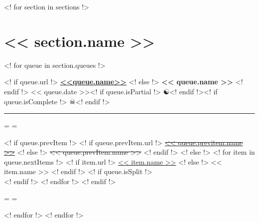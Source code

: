 \documentclass[a4paper]{article}
\newenvironment{fontspace}[2]
{\par
  \origiwspc=\fontdimen2\font
  \origiwstr=\fontdimen3\font
  \fontdimen2\font=#1\origiwspc
  \fontdimen3\font=#2\origiwstr
}
{\par
   \fontdimen2\font=\origiwspc
   \fontdimen3\font=\origiwstr
}
\newcommand*{\partialMark}{☯}
\newcommand*{\completeMark}{☠}
\newcommand*{\previous}[1]{\st{#1}}
\begin{document}
<! for section in sections !>
\section*{<< section.name >>}

<! for queue in section.queues !>
\begin{minipage}{1.0\textwidth}
<! if queue.url !>
\href{<< queue.url >>}{\bfseries <<queue.name>>}\hfill
<! else !>
\textbf{<< queue.name >>}\hfill
<! endif !>
<< queue.date >><! if queue.isPartial !> \partialMark<! endif !><! if queue.isComplete !> \completeMark<! endif !>\\
\vspace{-1em}
\hrule
\vspace{0.2em}
\begin{fontspace}{1.5}{2}
<! if queue.prevItem !>
<! if queue.prevItem.url !>
\href{<< queue.prevItem.url >>}{\previous{<< queue.previtem.name >>}}
<! else !>
\previous{<< queue.prevItem.name >>}
<! endif !>
<! else !>
<! for item in queue.nextItems !>
<! if item.url !>
\href{<< item.url >>}{<< item.name >>}
<! else !>
<< item.name >>
<! endif !>
<! if queue.isSplit !>\\<! endif !>
<! endfor !>
<! endif !>
\end{fontspace}
\end{minipage}
\vspace{2em}

<! endfor !>
<! endfor !>
\end{document}
